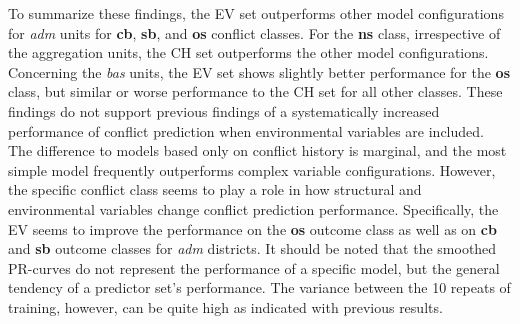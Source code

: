 \documentclass[a4paper,11pt]{article}
\begin{document}
To summarize these findings, the EV set outperforms other model configurations for
\emph{adm} units for \textbf{cb}, \textbf{sb}, and \textbf{os} conflict classes. For the \textbf{ns} class,
irrespective of the aggregation units, the CH set outperforms the other model
configurations. Concerning the \emph{bas} units, the EV set shows slightly better
performance for the \textbf{os} class, but similar or worse performance to the CH set
for all other classes. These findings do not support previous findings of a
systematically increased performance of conflict prediction when environmental
variables are included. The difference to models based only on conflict
history is marginal, and the most simple model frequently outperforms complex
variable configurations. However, the specific conflict class seems to play a role
in how structural and environmental variables change conflict prediction performance.
Specifically, the EV seems to improve the performance on the \textbf{os} outcome class
as well as on \textbf{cb} and \textbf{sb} outcome classes for \emph{adm} districts.
It should be noted that the smoothed PR-curves do not represent the performance
of a specific model, but the general tendency of a predictor set's performance.
The variance between the 10 repeats of training, however, can be quite high as
indicated with previous results.
\end{document}
